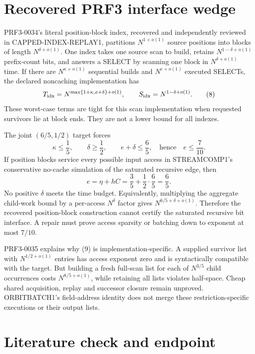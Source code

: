 \documentclass[11pt]{article}
\begin{document}
\section{Recovered PRF3 interface wedge}

PRF3-0034's literal position-block index, recovered and independently
reviewed in CAPPED-INDEX-REPLAY1, partitions $N^{1+o(1)}$ source positions
into blocks of length $N^{\delta+o(1)}$.  One index takes one source scan to
build, retains $N^{1-\delta+o(1)}$ prefix-count bits, and answers a SELECT by
scanning one block in $N^{\delta+o(1)}$ time.  If there are
$N^{\kappa+o(1)}$ sequential builds and $N^{e+o(1)}$ executed SELECTs, the
declared noncaching implementation has
\[
 T_{\rm idx}=N^{\max\{1+\kappa,e+\delta\}+o(1)},\qquad
 S_{\rm idx}=N^{1-\delta+o(1)}.                            \tag{8}
\]
These worst-case terms are tight for this scan implementation when requested
survivors lie at block ends.  They are not a lower bound for all indexes.

The joint $(6/5,1/2)$ target forces
\[
 \kappa\le\frac15,\qquad \delta\ge\frac12,
 \qquad e+\delta\le\frac65,
 \quad\text{hence}\quad \boxed{e\le\frac7{10}}.           \tag{9}
\]
If position blocks service every possible input access in STREAMCOMP1's
conservative no-cache simulation of the saturated recursive edge, then
\[
 e=\eta+hC=\frac35+\frac12\cdot\frac65=\frac65.           \tag{10}
\]
No positive $\delta$ meets the time budget.  Equivalently, multiplying the
aggregate child-work bound by a per-access $N^\delta$ factor gives
$N^{6/5+\delta+o(1)}$.  Therefore the recovered position-block construction
cannot certify the saturated recursive bit interface.  A repair must prove
access sparsity or batching down to exponent at most $7/10$.

PRF3-0035 explains why (9) is implementation-specific.  A supplied survivor
list with $N^{1/2+o(1)}$ entries has access exponent zero and is syntactically
compatible with the target.  But building a fresh full-scan list for each of
$N^{3/5}$ child occurrences costs $N^{8/5+o(1)}$, while retaining all lists
violates half-space.  Cheap shared acquisition, replay and successor closure
remain unproved.  ORBITBATCH1's field-address identity does not merge these
restriction-specific executions or their output lists.

\section{Literature check and endpoint}
\end{document}
